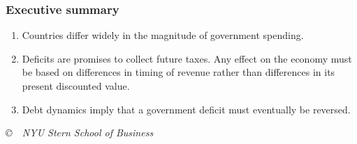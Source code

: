 \documentclass[letterpaper,12pt]{article}
\begin{document}
\subsubsection*{Executive summary}

\begin{enumerate}

\item Countries differ widely in the magnitude of government spending.  

\item Deficits are promises to collect future taxes.  Any effect on the economy must be based on differences in timing of revenue rather than differences in its present discounted value.

\item Debt dynamics imply that a government deficit must eventually 
be reversed. 

\end{enumerate}


\begin{comment}
\subsubsection*{Review questions}

\begin{enumerate}

\item 

\end{enumerate}
\end{comment}



\vfill \centerline{\it \copyright \ \number\year \  
NYU Stern School of Business}
\end{document}
